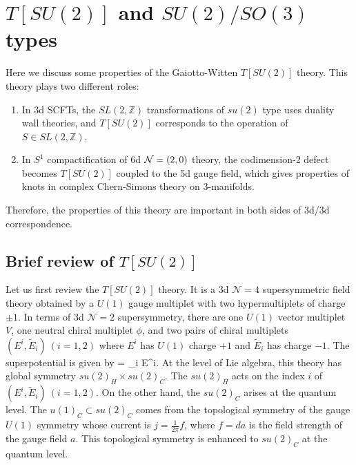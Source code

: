 \documentclass[a4paper,11pt]{article}
\def\CN{{\cal N}}
\def\BZ{{\mathbb Z}}
\def\beq#1\eeq{\begin{align}#1\end{align}}
\begin{document}
\section{$T[SU(2)]$ and $SU(2)/SO(3)$ types}\label{app:susotypes}

Here we discuss some properties of the Gaiotto-Witten $T[SU(2)]$ theory.
This theory plays two different roles:
\begin{enumerate}
\item In 3d SCFTs, the $SL(2, \BZ) $ transformations of $su(2)$ type uses duality wall theories, and $T[SU(2)]$ corresponds to the operation of $S \in SL(2,\BZ)$.
\item In $S^1$ compactification of 6d $\CN=(2,0)$ theory, the codimension-2 defect becomes $T[SU(2)]$ coupled to the 5d gauge field, 
which gives properties of knots in complex Chern-Simons theory on 3-manifolds.
\end{enumerate} 
Therefore, the properties of this theory are important in both sides of 3d/3d correspondence.


\subsection{Brief review of $T[SU(2)]$}\label{app:brief}
Let us first review the $T[SU(2)]$ theory. It is a 3d $\mathcal{N}=4$ supersymmetric field theory obtained by
a $U(1)$ gauge multiplet with two hypermultiplets of charge $\pm 1$. In terms of 3d $\mathcal{N}=2$ supersymmetry,
there are one $U(1)$ vector multiplet $V$, one neutral chiral multiplet $\phi$, and two pairs of chiral multiplets $(E^i, \tilde{E}_i)~(i=1,2)$ where $E^i$ has $U(1)$ charge $+1$
and $\tilde{E}_i$ has charge $-1$.
The superpotential is given by
\beq
W = \phi {}_i E^i.
\eeq
At the level of Lie algebra, this theory has global symmetry $su(2)_H \times su(2)_C$.
The $su(2)_H$ acts on the index $i$ of $(E^i, \tilde{E}_i)~(i=1,2)$. On the other hand, the $su(2)_C$ arises at the quantum level.
The $u(1)_C \subset su(2)_C$ comes from the topological symmetry of the gauge $U(1)$ symmetry whose current is $j = \frac{1}{2\pi}f$, where $f=da$ is the field strength of the gauge field $a$.
This topological symmetry is enhanced to $su(2)_C$ at the quantum level. 
\end{document}
